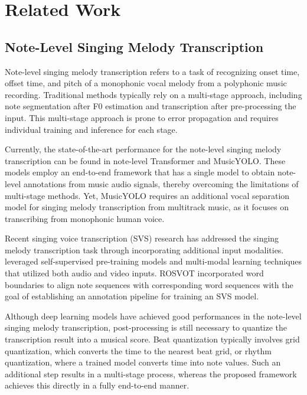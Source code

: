 \section{Related Work}
\subsection{Note-Level Singing Melody Transcription}
Note-level singing melody transcription refers to a task of recognizing onset time, offset time, and pitch of a monophonic vocal melody from a polyphonic music recording. Traditional methods typically rely on a multi-stage approach, including note segmentation after F0 estimation\cite{jdc} and transcription after pre-processing the input\cite{st500}. This multi-stage approach is prone to error propagation and requires individual training and inference for each stage.

Currently, the state-of-the-art performance for the note-level singing melody transcription can be found in note-level Transformer\cite{jong} and MusicYOLO\cite{musicyolo}. 
These models employ an end-to-end framework that has a single model to obtain note-level annotations from music audio signals, thereby overcoming the limitations of multi-stage methods. Yet, MusicYOLO requires an additional vocal separation model\cite{spleeter} for singing melody transcription from multitrack music, as it focuses on transcribing from monophonic human voice.

Recent singing voice transcription (SVS) research\cite{av-svt, altamt, rosvot} has addressed the singing melody transcription task through incorporating additional input modalities. \cite{av-svt, altamt} leveraged self-supervised pre-training models\cite{wav2vec, av-hubert} and multi-modal learning techniques that utilized both audio and video inputs. ROSVOT\cite{rosvot} incorporated word boundaries to align note sequences with corresponding word sequences with the goal of establishing an annotation pipeline for training an SVS model.

Although deep learning models have achieved good performances in the note-level singing melody transcription, post-processing is still necessary to quantize the transcription result into a musical score. Beat quantization typically involves grid quantization\cite{quantization}, which converts the time to the nearest beat grid, or rhythm quantization, where a trained model\cite{nakamura_rhythm} converts time into note values. Such an additional step results in a multi-stage process, whereas the proposed framework achieves this directly in a fully end-to-end manner.

